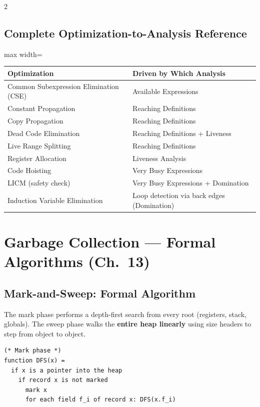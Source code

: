 \documentclass[9pt,landscape]{extarticle}
\begin{document}
\begin{multicols}{2}
\subsection{Complete Optimization-to-Analysis Reference}

\begin{adjustbox}{max width=\columnwidth}
\begin{tabular}{@{}ll@{}}
\toprule
\textbf{Optimization} & \textbf{Driven by Which Analysis} \\
\midrule
Common Subexpression Elimination (CSE) & Available Expressions \\
Constant Propagation & Reaching Definitions \\
Copy Propagation & Reaching Definitions \\
Dead Code Elimination & Reaching Definitions + Liveness \\
Live Range Splitting & Reaching Definitions \\
Register Allocation & Liveness Analysis \\
Code Hoisting & Very Busy Expressions \\
LICM (safety check) & Very Busy Expressions + Domination \\
Induction Variable Elimination & Loop detection via back edges (Domination) \\
\bottomrule
\end{tabular}
\end{adjustbox}


\section{Garbage Collection --- Formal Algorithms (Ch.~13)}

\subsection{Mark-and-Sweep: Formal Algorithm}

The mark phase performs a depth-first search from every root (registers, stack, globals). The sweep phase walks the \textbf{entire heap linearly} using size headers to step from object to object.

\begin{lstlisting}
(* Mark phase *)
function DFS(x) =
  if x is a pointer into the heap
    if record x is not marked
      mark x
      for each field f_i of record x: DFS(x.f_i)


\end{lstlisting}
\end{multicols}
\end{document}
